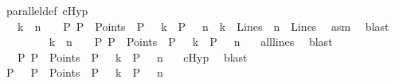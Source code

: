 \begin{isabellebody}
\ parallel{\isacharunderscore}{\kern0pt}def\ cHyp\ \ \isamarkupfalse%
\ {}{\isacharcolon}{\kern0pt}\ {\isachardoublequoteopen}\ {\isacharparenleft}{\kern0pt}{\isacharparenleft}{\kern0pt}{\isasymnot}{\isacharparenleft}{\kern0pt}k\ {\isacharequal}{\kern0pt}\ n{\isacharparenright}{\kern0pt}{\isacharparenright}{\kern0pt}\ {\isasymand}\ \ {\isacharparenleft}{\kern0pt}{\isacharparenleft}{\kern0pt}{\isacharparenleft}{\kern0pt}{\isasymexists}\ P{\isachardot}{\kern0pt}\ P\ {\isasymin}\ Points\ {\isasymand}\ P\ {\isasymlhd}\ \ k\ {\isasymand}\ P\ {\isasymlhd}\ \ n{\isacharparenright}{\kern0pt}{\isacharparenright}{\kern0pt}\ {\isasymor}\ {\isacharparenleft}{\kern0pt}k\ {\isasymnotin}\ Lines{\isacharparenright}{\kern0pt}\ {\isasymor}\ {\isacharparenleft}{\kern0pt}n\ {\isasymnotin}\ Lines{\isacharparenright}{\kern0pt}{\isacharparenright}{\kern0pt}{\isacharparenright}{\kern0pt}{\isachardoublequoteclose}\ \isamarkupfalse%
\ asm{}\ \isamarkupfalse%
\ blast\ \isanewline
\ \ \ \ \ \ \isamarkupfalse%
\ {}{\isacharcolon}{\kern0pt}\ {\isachardoublequoteopen}{\isacharparenleft}{\kern0pt}{\isasymnot}{\isacharparenleft}{\kern0pt}k\ {\isacharequal}{\kern0pt}\ n{\isacharparenright}{\kern0pt}{\isacharparenright}{\kern0pt}\ {\isasymand}\ \ {\isacharparenleft}{\kern0pt}{\isacharparenleft}{\kern0pt}{\isacharparenleft}{\kern0pt}{\isasymexists}\ P{\isachardot}{\kern0pt}\ P\ {\isasymin}\ Points\ {\isasymand}\ P\ {\isasymlhd}\ \ k\ {\isasymand}\ P\ {\isasymlhd}\ \ n{\isacharparenright}{\kern0pt}{\isacharparenright}{\kern0pt}{\isacharparenright}{\kern0pt}{\isachardoublequoteclose}\ \isamarkupfalse%
\ {}\ all{\isacharunderscore}{\kern0pt}lines\ \isamarkupfalse%
\ blast\isanewline
\ \ \ \ \ \ \isamarkupfalse%
\ {}{\isacharcolon}{\kern0pt}\ {\isachardoublequoteopen}{\isacharparenleft}{\kern0pt}{\isasymexists}\ P{\isachardot}{\kern0pt}\ P\ {\isasymin}\ Points\ {\isasymand}\ P\ {\isasymlhd}\ \ k\ {\isasymand}\ P\ {\isasymlhd}\ \ n{\isacharparenright}{\kern0pt}{\isachardoublequoteclose}\ \isamarkupfalse%
\ {}\ cHyp\ \isamarkupfalse%
\ blast\isanewline
\ \ \ \ \ \ \isamarkupfalse%
\ P\ \ {}{\isacharcolon}{\kern0pt}\ {\isachardoublequoteopen}P\ {\isasymin}\ Points\ {\isasymand}\ P\ {\isasymlhd}\ \ k\ {\isasymand}\ P\ {\isasymlhd}\ \ n{\isachardoublequoteclose}\ \isamarkupfalse%

\end{isabellebody}

